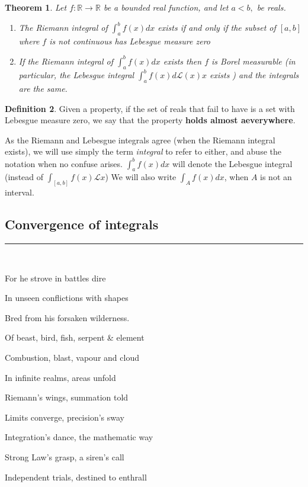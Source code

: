 \documentclass[reqno,a4paper,12pt]{amsart}%
\numberwithin{equation}{section}
\newtheorem{theorem}{Theorem}
\theoremstyle{definition}
\newtheorem{definition}[theorem]{Definition}
\newcommand{\Rr}{{\mathbb{R}}}
\begin{document}
\begin{theorem}
	Let $f: \Rr \to \Rr $ be a bounded real function, and let $a<b,$ be reals.
	\begin{enumerate}
		\item The Riemann integral of $\int_a^b f(x)dx$ exists if and only if the subset of $[a,b]$ where $f$ is not continuous has Lebesgue measure zero
		\item If  the Riemann integral of $\int_a^b f(x)dx$ exists then $f$ is Borel measurable (in particular, the Lebesgue integral $\int_a^b f(x)d\mathcal{L}(x) x$ exists ) and the integrals are the same.
	\end{enumerate} 
\end{theorem}
  
\begin{definition}
	Given a property, if the set of reals that fail to have is a set with Lebesgue measure zero, we say that the property \textbf{holds almost aeverywhere}. 
\end{definition}
 
As the Riemann and Lebesgue integrals agree (when the Riemann integral exists), we will use simply the term \textit{integral} to refer to either, and abuse the notation when no confuse arises.
$\int_a^b f(x) dx $ will denote the Lebesgue integral (instead of $\int_{[a,b]}f(x) \mathcal{L}x$)
We will also write $\int_A f(x) dx $, when $A$ is not an interval.


\subsection{Convergence of integrals}
 
\begin{center}
	\par\noindent\rule{200pt}{0.1pt}
\end{center}

\


\begin{center}		
For he strove in battles dire 

In unseen conflictions with shapes 

Bred from his forsaken wilderness. 

Of beast, bird, fish, serpent \& element 

Combustion, blast, vapour and cloud 

In infinite realms, areas unfold

Riemann's wings, summation told

Limits converge, precision's sway

Integration's dance, the mathematic way

Strong Law's grasp, a siren's call

Independent trials, destined to enthrall

\end{center}
\end{document}
